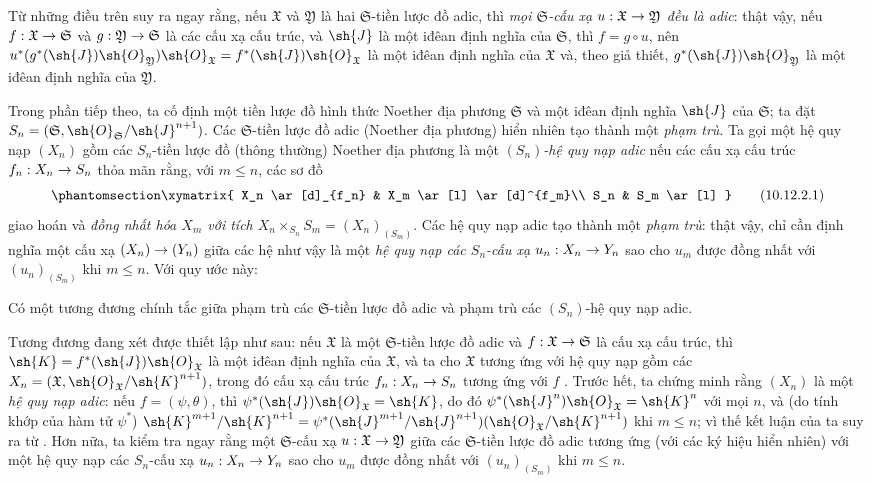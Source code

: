 \documentclass[oneside]{amsart}
\makeatletter
\renewcommand{\leq}{\leqslant}
\newcommand{\ega@arrow}[2]{\mathchoice{#1}{#2}{#2}{#2}}
\renewcommand{\to}{\ega@arrow{\longrightarrow}{\rightarrow}}
\newcommand{\oldpage}[2][]{{\marginnote{\normalfont\textbf{#1}~|~#2}}\ignorespaces}
\let\EGAOriginalLabel\label
\renewcommand{\label}[1]{\phantomsection\EGAOriginalLabel{#1}}
\makeatother
\begin{document}
Từ những điều trên suy ra ngay rằng, nếu $\mathfrak{X}$ và $\mathfrak{Y}$ là hai $\mathfrak{S}$-tiền lược đồ adic, thì \emph{mọi $\mathfrak{S}$-cấu xạ $u:\mathfrak{X}\to\mathfrak{Y}$ đều là adic}:
thật vậy, nếu $f:\mathfrak{X}\to\mathfrak{S}$ và $g:\mathfrak{Y}\to\mathfrak{S}$ là các cấu xạ cấu trúc, và $\sh{J}$ là một iđêan định nghĩa của $\mathfrak{S}$, thì $f=g\circ u$, nên $u^*(g^*(\sh{J})\sh{O}_\mathfrak{Y})\sh{O}_\mathfrak{X}=f^*(\sh{J})\sh{O}_\mathfrak{X}$ là một iđêan định nghĩa của $\mathfrak{X}$ và, theo giả thiết, $g^*(\sh{J})\sh{O}_\mathfrak{Y}$ là một iđêan định nghĩa của $\mathfrak{Y}$.

\begin{env}[10.12.2]
\label{I.10.12.2}
Trong phần tiếp theo, ta cố định một tiền lược đồ hình thức Noether địa phương $\mathfrak{S}$ và một iđêan định nghĩa $\sh{J}$ của $\mathfrak{S}$;
ta đặt $S_n=(\mathfrak{S},\sh{O}_\mathfrak{S}/\sh{J}^{n+1})$.
Các $\mathfrak{S}$-tiền lược đồ adic (Noether địa phương) hiển nhiên tạo thành một \emph{phạm trù}.
Ta gọi một hệ quy nạp $(X_n)$ gồm các $S_n$-tiền lược đồ (thông thường) Noether địa phương là một \emph{$(S_n)$-hệ quy nạp adic} nếu các cấu xạ cấu trúc $f_n:X_n\to S_n$ thỏa mãn rằng, với $m\leq n$, các sơ đồ
\[
\label{I.10.12.2.1}
  \xymatrix{
    X_n \ar[d]_{f_n}
    & X_m \ar[l] \ar[d]^{f_m}\\
    S_n
    & S_m \ar[l]
  }
  \tag{10.12.2.1}
\]
giao hoán và \emph{đồng nhất hóa $X_m$ với tích $X_n\times_{S_n}S_m=(X_n)_{(S_m)}$}.
Các hệ quy nạp adic tạo thành một \emph{phạm trù}:
thật vậy, chỉ cần định nghĩa một cấu xạ $(X_n)\to(Y_n)$ giữa các hệ như vậy là một \emph{hệ quy nạp các $S_n$-cấu xạ $u_n:X_n\to Y_n$} sao cho $u_m$ được đồng nhất với $(u_n)_{(S_m)}$ khi $m\leq n$.
Với quy ước này:
\end{env}

\begin{theorem}[10.12.3]
\label{I.10.12.3}
Có một tương đương chính tắc giữa phạm trù các $\mathfrak{S}$-tiền lược đồ adic và phạm trù các $(S_n)$-hệ quy nạp adic.
\end{theorem}

Tương đương đang xét được thiết lập như sau:
nếu $\mathfrak{X}$ là một $\mathfrak{S}$-tiền lược đồ adic và $f:\mathfrak{X}\to\mathfrak{S}$ là cấu xạ cấu trúc, thì $\sh{K}=f^*(\sh{J})\sh{O}_\mathfrak{X}$ là một iđêan định nghĩa của $\mathfrak{X}$, và ta cho $\mathfrak{X}$ tương ứng với hệ quy nạp gồm các $X_n=(\mathfrak{X},\sh{O}_\mathfrak{X}/\sh{K}^{n+1})$, trong đó cấu xạ cấu trúc $f_n:X_n\to S_n$ tương ứng với $f$ .
Trước hết, ta chứng minh rằng $(X_n)$ là một \emph{hệ quy nạp adic}:
nếu $f=(\psi,\theta)$, thì $\psi^*(\sh{J})\sh{O}_\mathfrak{X}=\sh{K}$, do đó $\psi^*(\sh{J}^n)\sh{O}_\mathfrak{X}=\sh{K}^n$ với mọi $n$, và (do tính khớp của hàm tử $\psi^*$) $\sh{K}^{m+1}/\sh{K}^{n+1}=\psi^*(\sh{J}^{m+1}/\sh{J}^{n+1})(\sh{O}_\mathfrak{X}/\sh{K}^{n+1})$ khi $m\leq n$;
vì thế kết luận của ta suy ra từ .
Hơn nữa, ta kiểm tra ngay rằng một $\mathfrak{S}$-cấu xạ $u:\mathfrak{X}\to\mathfrak{Y}$ giữa các $\mathfrak{S}$-tiền lược đồ adic tương ứng (với các ký hiệu hiển nhiên) với
\oldpage[I]{207}
một hệ quy nạp các $S_n$-cấu xạ $u_n:X_n\to Y_n$ sao cho $u_m$ được đồng nhất với $(u_n)_{(S_m)}$ khi $m\leq n$.
\end{document}
